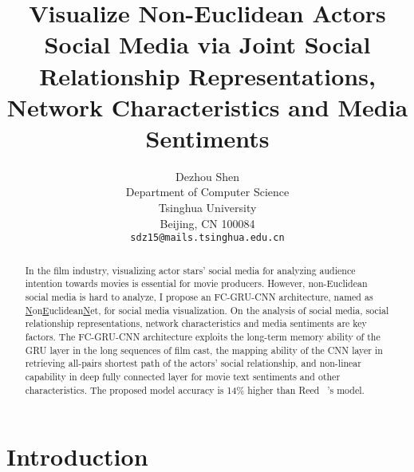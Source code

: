 \documentclass[review]{cvpr}
\begin{document}
\title{Visualize Non-Euclidean Actors Social Media via Joint Social Relationship Representations, Network Characteristics and Media Sentiments}

\author{Dezhou Shen\\
Department of Computer Science\\
Tsinghua University\\
Beijing, CN 100084\\
{\tt\small sdz15@mails.tsinghua.edu.cn}
}

\maketitle


\begin{abstract}

  In the film industry, visualizing actor stars' social media for analyzing audience intention towards movies is essential for movie producers.
  However, non-Euclidean social media is hard to analyze, I propose an FC-GRU-CNN architecture, named as \underline{N}on\underline{E}uclidean\underline{N}et, for social media visualization.
  On the analysis of social media, social relationship representations, network characteristics and media sentiments are key factors.
  The FC-GRU-CNN architecture exploits the long-term memory ability of the GRU layer in the long sequences of film cast,
  the mapping ability of the CNN layer in retrieving all-pairs shortest path of the actors' social relationship,
  and non-linear capability in deep fully connected layer for movie text sentiments and other characteristics.
  The proposed model accuracy is 14\% higher than Reed \etal~\cite{reed2016learning}'s model.

\end{abstract}

\section{Introduction}
\end{document}
